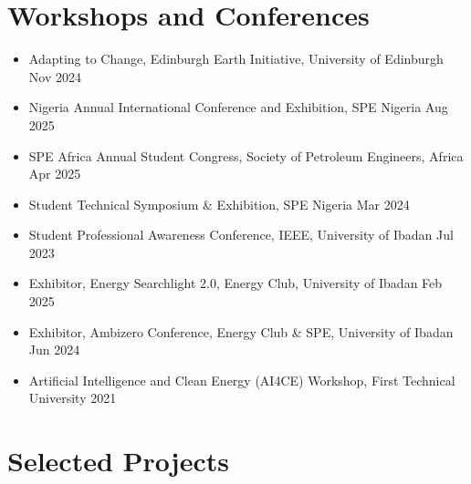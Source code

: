 \documentclass[10pt, a4paper]{article}
\begin{document}
\section{Workshops and Conferences}

\begin{itemize}
  \item Adapting to Change, Edinburgh Earth Initiative, University of Edinburgh \hfill Nov 2024
  \item Nigeria Annual International Conference and Exhibition, SPE Nigeria \hfill Aug 2025
  \item SPE Africa Annual Student Congress, Society of Petroleum Engineers, Africa \hfill Apr 2025
  \item Student Technical Symposium \& Exhibition, SPE Nigeria \hfill Mar 2024
  \item Student Professional Awareness Conference, IEEE, University of Ibadan \hfill Jul 2023
  \item Exhibitor, Energy Searchlight 2.0, Energy Club, University of Ibadan \hfill Feb 2025
  \item Exhibitor, Ambizero Conference, Energy Club \& SPE, University of Ibadan \hfill Jun 2024
  \item Artificial Intelligence and Clean Energy (AI4CE) Workshop, First Technical University \hfill 2021
\end{itemize}

\section{Selected Projects}
\end{document}
